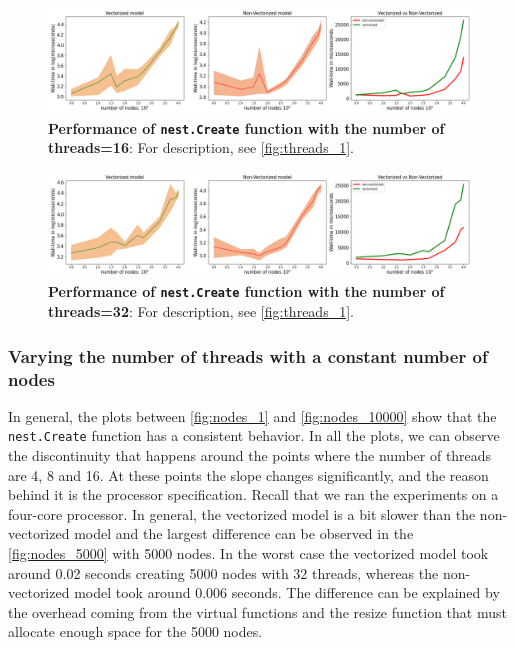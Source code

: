 \begin{figure}[t!]
    \centering
    \includegraphics[width=\textwidth]{src/pic/thread_16.png}
    \caption{\textbf{Performance of \texttt{nest.Create} function with the number of threads=16}: For description, see \autoref{fig:threads_1}.}
    \label{fig:threads_16}
\end{figure}

\begin{figure}[t!]
    \centering
    \includegraphics[width=\textwidth]{src/pic/thread_32.png}
    \caption{\textbf{Performance of \texttt{nest.Create} function with the number of threads=32}: For description, see \autoref{fig:threads_1}.}
    \label{fig:threads_32}
\end{figure}

\subsubsection*{Varying the number of threads with a constant number of nodes}


In general, the plots between \autoref{fig:nodes_1} and \autoref{fig:nodes_10000} show that the \texttt{nest.Create} function has a consistent behavior. In all the plots, we can observe the discontinuity that happens around the points where the number of threads are 4, 8 and 16. At these points the slope changes significantly, and the reason behind it is the processor specification. Recall that we ran the experiments on a four-core processor. In general, the vectorized model is a bit slower than the non-vectorized model and the largest difference can be observed in the \autoref{fig:nodes_5000} with 5000 nodes. In the worst case the vectorized model took around 0.02 seconds creating 5000 nodes with 32 threads, whereas the non-vectorized model took around 0.006 seconds. The difference can be explained by the overhead coming from the virtual functions and the resize function that must allocate enough space for the 5000 nodes.

